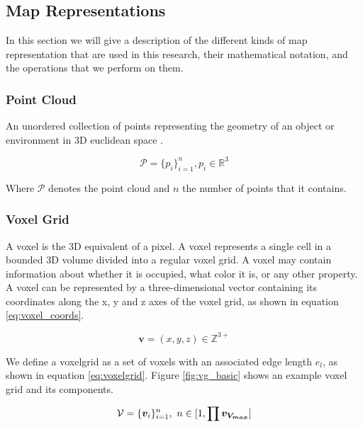 \subsection{Map Representations}
In this section we will give a description of the different kinds of map representation that are used in this research, their mathematical notation, and the operations that we perform on them.

\subsubsection{Point Cloud}
An unordered collection of points representing the geometry of an object or environment in 3D euclidean space \citep{volodine_point_2007}.

\begin{equation}
\mathcal{P}=\{p_i\}_{i=1}^n, p_i \in \mathbb{R}^3
\end{equation}

Where \(\mathcal{P}\) denotes the point cloud and \(n\) the number of points that it contains.

\subsubsection{Voxel Grid}
A voxel is the 3D equivalent of a pixel. A voxel represents a single cell in a bounded 3D volume divided into a regular voxel grid. A voxel may contain information about whether it is occupied, what color it is, or any other property. A voxel can be represented by a three-dimensional vector containing its coordinates along the x, y and z axes of the voxel grid, as shown in equation \ref{eq:voxel_coords}. 

\begin{equation}
    \label{eq:voxel_coords}
    \boldsymbol{v} = (x, y, z) \in \mathbb{Z}^{3+}
\end{equation}

We define a \gls{voxelgrid} as a set of voxels with an associated edge length \(e_{l}\), as shown in equation \ref{eq:voxelgrid}. Figure \ref{fig:vg_basic} shows an example voxel grid and its components.

\begin{equation}
    \label{eq:voxelgrid}
    \mathcal{V}=\{\boldsymbol{v}_{i}\}_{i=1}^{n},\ n \in [1, \prod{\boldsymbol{v_{V_{max}}}}]
\end{equation}

